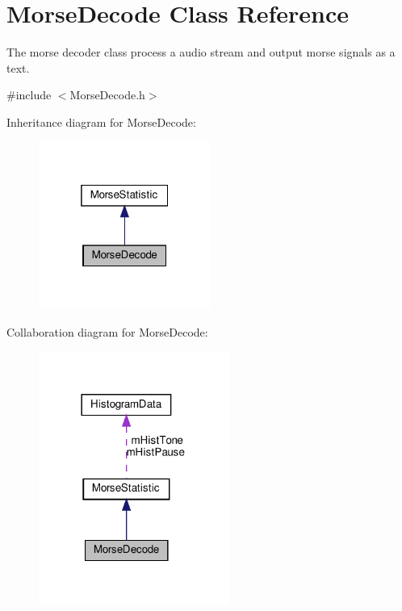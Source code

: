 \hypertarget{classMorseDecode}{}\section{Morse\+Decode Class Reference}
\label{classMorseDecode}


The morse decoder class process a audio stream and output morse signals as a text.  




{\ttfamily \#include $<$Morse\+Decode.\+h$>$}



Inheritance diagram for Morse\+Decode\+:\nopagebreak
\begin{figure}[H]
\begin{center}
\leavevmode
\includegraphics[width=160pt]{classMorseDecode__inherit__graph}
\end{center}
\end{figure}


Collaboration diagram for Morse\+Decode\+:\nopagebreak
\begin{figure}[H]
\begin{center}
\leavevmode
\includegraphics[width=177pt]{classMorseDecode__coll__graph}
\end{center}
\end{figure}
